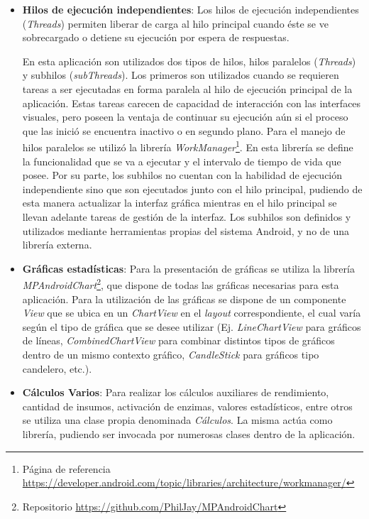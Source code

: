 \begin{itemize}
        \item \textbf{Hilos de ejecución independientes}: Los hilos de ejecución independientes (\textit{Threads}) permiten liberar de carga al hilo principal cuando éste se ve sobrecargado o detiene su ejecución por espera de respuestas. 
        
        \par En esta aplicación son utilizados dos tipos de hilos, hilos paralelos (\textit{Threads}) y subhilos (\textit{subThreads}). Los primeros son utilizados cuando se requieren tareas a ser ejecutadas en forma paralela al hilo de ejecución principal de la aplicación. Estas tareas carecen de capacidad de interacción con las interfaces visuales, pero poseen la ventaja de continuar su ejecución aún si el proceso que las inició se encuentra inactivo o en segundo plano. Para el manejo de hilos paralelos se utilizó la librería \textit{WorkManager}\footnote{Página de referencia \url{https://developer.android.com/topic/libraries/architecture/workmanager/}}. En esta librería se define la funcionalidad que se va a ejecutar y el intervalo de tiempo de vida que posee. Por su parte, los subhilos no cuentan con la habilidad de ejecución independiente sino que son ejecutados junto con el hilo principal, pudiendo de esta manera actualizar la interfaz gráfica mientras en el hilo principal se llevan adelante tareas de gestión de la interfaz. Los subhilos son definidos y utilizados mediante herramientas propias del sistema Android, y no de una librería externa.
        
        \item \textbf{Gráficas estadísticas}: Para la presentación de gráficas se utiliza la librería \textit{MPAndroidChart}\footnote{Repositorio \url{https://github.com/PhilJay/MPAndroidChart}}, que dispone de todas las gráficas necesarias para esta aplicación. Para la utilización de las gráficas se dispone de un componente \textit{View} que se ubica en un \textit{ChartView} en el \textit{layout} correspondiente, el cual varía según el tipo de gráfica que se desee utilizar (Ej. \textit{LineChartView} para gráficos de líneas, \textit{CombinedChartView} para combinar distintos tipos de gráficos dentro de un mismo contexto gráfico, \textit{CandleStick} para gráficos tipo candelero, etc.).
        
        \item \textbf{Cálculos Varios}: Para realizar los cálculos auxiliares de rendimiento, cantidad de insumos, activación de enzimas, valores estadísticos, entre otros se utiliza una clase propia denominada \textit{Cálculos}. La misma actúa como librería, pudiendo ser invocada por numerosas clases dentro de la aplicación.
        
     \end{itemize}
     
